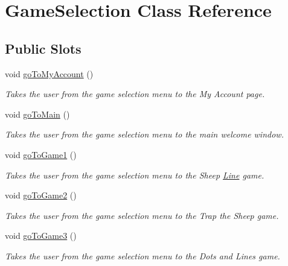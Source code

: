 \hypertarget{classGameSelection}{\section{\-Game\-Selection \-Class \-Reference}
\label{classGameSelection}
}
\subsection*{\-Public \-Slots}
\begin{DoxyCompactItemize}
\item 
void \hyperlink{classGameSelection_ac05fa74d67c03407e532fb627eaafd37}{go\-To\-My\-Account} ()
\begin{DoxyCompactList}\small\item\em \-Takes the user from the game selection menu to the \-My \-Account page. \end{DoxyCompactList}\item 
void \hyperlink{classGameSelection_a9c137b0feaa79fa0be575e71fe12f60b}{go\-To\-Main} ()
\begin{DoxyCompactList}\small\item\em \-Takes the user from the game selection menu to the main welcome window. \end{DoxyCompactList}\item 
void \hyperlink{classGameSelection_a94882519629ecb0344fec9e0d8e1a66b}{go\-To\-Game1} ()
\begin{DoxyCompactList}\small\item\em \-Takes the user from the game selection menu to the \-Sheep \hyperlink{classLine}{\-Line} game. \end{DoxyCompactList}\item 
void \hyperlink{classGameSelection_a2836cb7f7290727491a4843a191cb9b2}{go\-To\-Game2} ()
\begin{DoxyCompactList}\small\item\em \-Takes the user from the game selection menu to the \-Trap the \-Sheep game. \end{DoxyCompactList}\item 
void \hyperlink{classGameSelection_a6aa089b1aca3b4cbabe883c920e89c6f}{go\-To\-Game3} ()
\begin{DoxyCompactList}\small\item\em \-Takes the user from the game selection menu to the \-Dots and \-Lines game. \end{DoxyCompactList}\end{DoxyCompactItemize}
